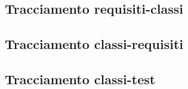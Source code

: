 \documentclass[a4paper]{article}
\begin{document}
	\subsection{Tracciamento requisiti-classi}
	
	\subsection{Tracciamento classi-requisiti}
	
	\subsection{Tracciamento classi-test}

		
	\newpage 
	
	\cleardoublepage
	\listoffigures
	
	\cleardoublepage
	\listoftables
		
\end{document}
